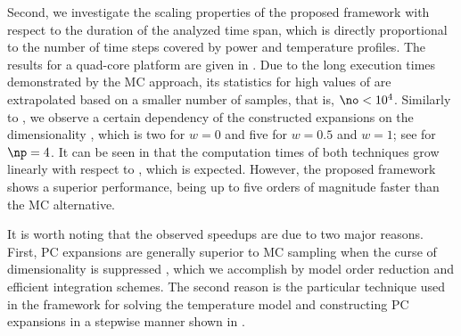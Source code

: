 Second, we investigate the scaling properties of the proposed framework with
respect to the duration of the analyzed time span, which is directly
proportional to the number of time steps \ns covered by power and temperature
profiles. The results for a quad-core platform are given in
. Due to the long execution times demonstrated
by the \ac{MC} approach, its statistics for high values of \ns are extrapolated
based on a smaller number of samples, that is, $\no < 10^4$. Similarly to
, we observe a certain dependency of the
constructed expansions on the dimensionality \nz, which is two for $w = 0$ and
five for $w = 0.5$ and $w = 1$; see  for
$\np = 4$. It can be seen in  that the
computation times of both techniques grow linearly with respect to \ns, which is
expected. However, the proposed framework shows a superior performance, being up
to five orders of magnitude faster than the \ac{MC} alternative.

It is worth noting that the observed speedups are due to two major reasons.
First, \ac{PC} expansions are generally superior to \ac{MC} sampling when the
curse of dimensionality is suppressed \cite{eldred2008, xiu2010}, which we
accomplish by model order reduction and efficient integration schemes. The
second reason is the particular technique used in the framework for solving the
temperature model and constructing \ac{PC} expansions in a stepwise manner shown
in .
